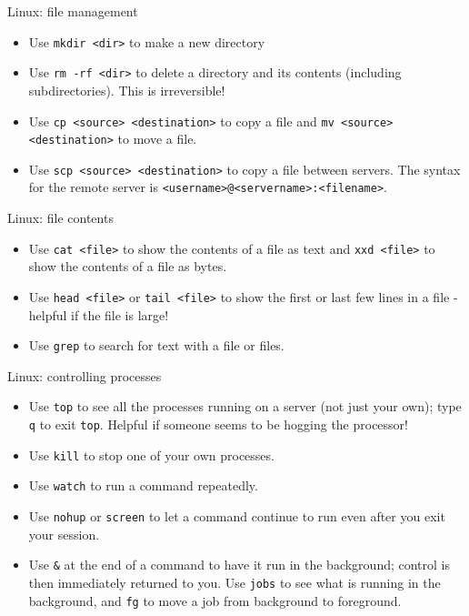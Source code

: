 \documentclass{beamer}
\newcommand{\command}[1]{\colorbox{light-gray}{\texttt{#1}}}
\newcommand{\filename}[1]{\colorbox{light-green}{\texttt{#1}}}
\begin{document}
\begin{frame}{Linux: file management}
  \begin{itemize}
  \item Use \command{mkdir <dir>} to make a new directory
  \item Use \command{rm -rf <dir>} to delete a directory and its contents (including subdirectories). This is irreversible!
  \item Use \command{cp <source> <destination>} to copy a file and \command{mv <source> <destination>} to move a file.
  \item Use \command{scp <source> <destination>} to copy a file between servers. The syntax for the remote server is \filename{<username>@<servername>:<filename>}.
  \end{itemize}
\end{frame}


\begin{frame}{Linux: file contents}
  \begin{itemize}
  \item Use \command{cat <file>} to show the contents of a file as text and \command{xxd <file>} to show the contents of a file as bytes.
  \item Use \command{head <file>} or \command{tail <file>} to show the first or last few lines in a file - helpful if the file is large!
  \item Use \command{grep} to search for text with a file or files.
  \end{itemize}
\end{frame}


\begin{frame}{Linux: controlling processes}
  \begin{itemize}
  \item Use \command{top} to see all the processes running on a server (not just your own); type \command{q} to exit \command{top}. Helpful if someone seems to be hogging the processor!
  \item Use \command{kill} to stop one of your own processes.
  \item Use \command{watch} to run a command repeatedly.
  \item Use \command{nohup} or \command{screen} to let a command continue to run even after you exit your session.
  \item Use \command{\&} at the end of a command to have it run in the background; control is then immediately returned to you. Use \command{jobs} to see what is running in the background, and \command{fg} to move a job from background to foreground.
  \end{itemize}
\end{frame}
\end{document}
